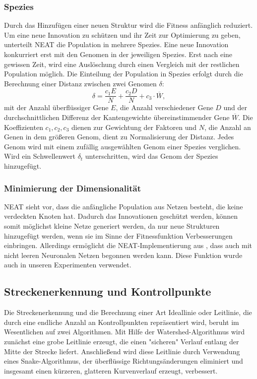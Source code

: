 \documentclass[11pt,final,journal,a4paper,towside,towcolumn]{IEEEtran}
\begin{document}
\subsubsection{Spezies}
Durch das Hinzufügen einer neuen Struktur wird die Fitness anfänglich reduziert. Um eine neue Innovation zu schützen und ihr Zeit zur Optimierung zu geben, unterteilt \ac{NEAT} die Population in mehrere Spezies. Eine neue Innovation konkurriert erst mit den Genomen in der jeweiligen Spezies. Erst nach eine gewissen Zeit, wird eine Auslöschung durch einen Vergleich mit der restlichen Population möglich. Die Einteilung der Population in Spezies erfolgt durch die Berechnung einer Distanz zwischen zwei Genomen $\delta$:
\begin{equation}
\delta=\frac{c_1E}{N} + \frac{c_2D}{N} + c_3\cdot \overline{W},
\end{equation}
mit der Anzahl überflüssiger Gene $E$, die Anzahl verschiedener Gene $D$ und der durchschnittlichen Differenz der Kantengewichte übereinstimmender Gene $\overline{W}$. Die Koeffizienten $c_1, c_2, c_3$ dienen zur Gewichtung der Faktoren und $N$, die Anzahl an Genen in dem größeren Genom, dient zu Normalisierung der Distanz. Jedes Genom wird mit einem zufällig ausgewählten Genom einer Spezies verglichen. Wird ein Schwellenwert $\delta_t$ unterschritten, wird das Genom der Spezies hinzugefügt.

\subsubsection{Minimierung der Dimensionalität}
\ac{NEAT} sieht vor, dass die anfängliche Population aus Netzen besteht, die keine verdeckten Knoten hat. Dadurch das Innovationen geschützt werden, können somit möglichst kleine Netze generiert werden, da nur neue Strukturen hinzugefügt werden, wenn sie im Sinne der Fitnessfunktion Verbesserungen einbringen.
Allerdings ermöglicht die \ac{NEAT}-Implementierung aus \cite{python-neat}, dass auch mit nicht leeren Neuronalen Netzen begonnen werden kann. Diese Funktion wurde auch in unseren Experimenten verwendet.

\subsection{Streckenerkennung und Kontrollpunkte}
Die Streckenerkennung und die Berechnung einer Art Ideallinie oder Leitlinie, die durch eine endliche Anzahl an Kontrollpunkten repräsentiert wird, beruht im Wesentlichen auf zwei Algorithmen. Mit Hilfe der Watershed-Algorithmus wird zunächst eine grobe Leitlinie erzeugt, die einen "sicheren" Verlauf entlang der Mitte der Strecke liefert. Anschließend wird diese Leitlinie durch Verwendung eines Snake-Algorithmus, der überflüssige Richtungsänderungen eliminiert und insgesamt einen kürzeren, glatteren Kurvenverlauf erzeugt, verbessert.
\end{document}
